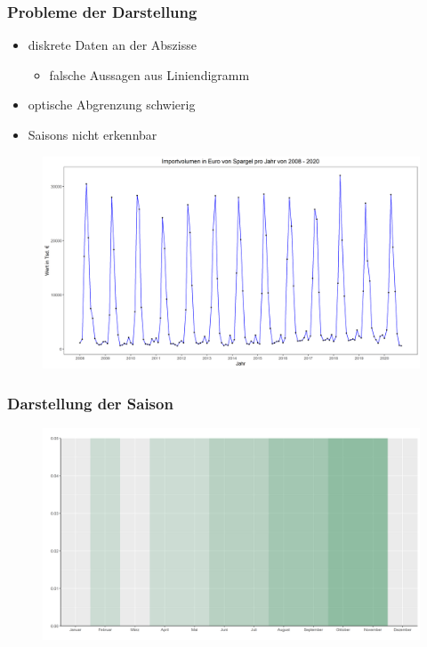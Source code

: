 \documentclass{beamer}
\begin{document}
\begin{frame}
	\frametitle{Probleme der Darstellung}
	\begin{itemize}
		\item diskrete Daten an der Abszisse
		\begin{itemize}
			\item falsche Aussagen aus Liniendigramm
		\end{itemize}
		\item optische Abgrenzung schwierig
		\item Saisons nicht erkennbar
	\end{itemize}

	\begin{figure}[b]
		\centering
		\includegraphics[scale=0.3]{Marco_2_Folie}
	\end{figure}
\end{frame}

\begin{frame}
	\frametitle{Darstellung der Saison}
	\begin{figure}
		\centering
		\includegraphics[scale=0.35]{Marco_3_Folie}
	\end{figure}
\end{frame}
\end{document}
